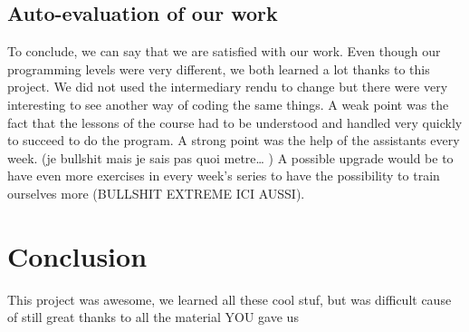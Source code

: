 \documentclass[a4paper]{article} %
\begin{document}
\begin{multicols*}{2}
\subsection{Auto-evaluation of our work}
To conclude, we can say that we are satisfied with our work.
Even though our programming levels were very different,
we both learned a lot thanks to this project.
We did not used the intermediary rendu to change
but there were very interesting to see another way of coding the same things.
A weak point was the fact that the lessons of the course had to be understood
and handled very quickly to succeed to do the program.
A strong point was the help of the assistants every week.
(je bullshit mais je sais pas quoi metre… )
A possible upgrade would be to have even more exercises in every week’s series
to have the possibility to train ourselves more (BULLSHIT EXTREME ICI AUSSI).

\section{Conclusion}
This project was awesome, we learned all these cool stuf,
but was difficult cause of
still great thanks to all the material YOU gave us

\label{lastpage}
\end{multicols*}
\end{document}
